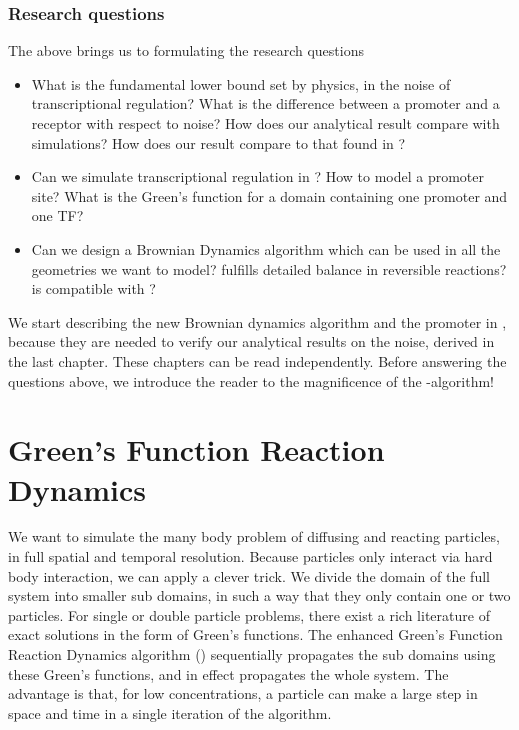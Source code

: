 \subsubsection{Research questions}
The above brings us to formulating the research questions
\begin{itemize}
 \item What is the fundamental lower bound set by physics, in the noise of transcriptional regulation?
 \subitem What is the difference between a promoter and a receptor with respect to noise?
 \subitem How does our analytical result compare with simulations? 
 \subitem How does our result compare to that found in \cite{Tkacik2009}?

 \item Can we simulate transcriptional regulation in \GFRD ?
 \subitem How to model a promoter site?
 \subitem What is the Green's function for a domain containing one promoter and one TF?
 
 \item Can we design a Brownian Dynamics algorithm which
 \subitem can be used in all the geometries we want to model?
 \subitem fulfills detailed balance in reversible reactions?
 \subitem is compatible with \GFRD ?
\end{itemize}
We start describing the new Brownian dynamics algorithm and the promoter in \GFRD, because they are needed to verify our analytical results on the noise, derived in the last chapter. These chapters can be read independently. Before answering the questions above, we introduce the reader to the magnificence of the \GFRD -algorithm!

\newpage
\section{Green's Function Reaction Dynamics}

We want to simulate the many body problem of diffusing and reacting particles, in full spatial and temporal resolution. Because particles only interact via hard body interaction, we can apply a clever trick. We divide the domain of the full system into smaller sub domains, in such a way that they only contain one or two particles. For single or double particle problems, there exist a rich literature of exact solutions in the form of Green's functions. The enhanced Green's Function Reaction Dynamics algorithm (\GFRD) sequentially propagates the sub domains using these Green's functions, and in effect propagates the whole system. \cite{VanZon2006}\cite{VanZon2005}\cite{Takahashi2010} The advantage is that, for low concentrations, a particle can make a large step in space and time in a single iteration of the algorithm.


